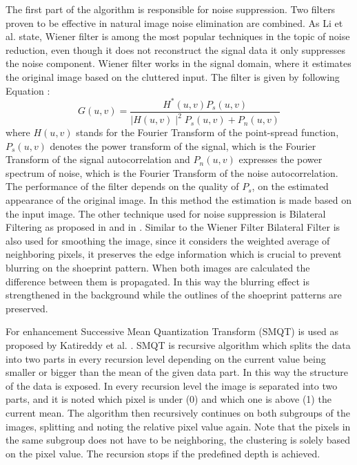 \documentclass[draft,final]{vutinfth} %
\begin{document}
\par
The first part of the algorithm is responsible for noise suppression.
Two filters proven to be effective in natural image noise elimination are combined.
As Li et al. \cite{li2014rapid} state, Wiener filter is among the most popular techniques in the topic of noise reduction, even though it does not reconstruct the signal data it only suppresses the noise component.
Wiener filter works in the signal domain, where it estimates the original image based on the cluttered input. 
The filter is given by following Equation \cite{Win}:
\[ G(u, v) = \frac{H^*(u,v) P_s(u, v)}{\mid H(u,v)\mid ^2 P_s (u, v) + P_n (u, v)}  \]
where $H(u,v)$ stands for the Fourier Transform of the point-spread function, $P_s (u,v)$ denotes the power transform of the signal, which is the Fourier Transform of the signal autocorrelation and $P_n(u,v)$ expresses the power spectrum of noise, which is the Fourier Transform of the noise autocorrelation.
The performance of the filter depends on the quality of $P_s$, on the estimated appearance of the original image.
In this method the estimation is made based on the input image.
The other technique used for noise suppression is Bilateral Filtering as proposed in \cite{huang2013self} and in \cite{zhang2016simultaneous}.
Similar to the Wiener Filter Bilateral Filter is also used for smoothing the image, since it considers the weighted average of neighboring pixels, it preserves the edge information which is crucial to prevent blurring on the shoeprint pattern. 
When both images are calculated the difference between them is propagated.
In this way the blurring effect is strengthened in the background while the outlines of the shoeprint patterns are preserved.
\par
For enhancement Successive Mean Quantization Transform (SMQT) \cite{nilsson2013smqt} is used as proposed by Katireddy et al. \cite{katireddy2017novel}.
SMQT is recursive algorithm which splits the data into two parts in every recursion level depending on the current value being smaller or bigger than the mean of the given data part.
In this way the structure of the data is exposed.
In every recursion level the image is separated into two parts, and it is noted which pixel is under (0) and which one is above (1) the current mean.
The algorithm then recursively continues on both subgroups of the images, splitting and noting the relative pixel value again.
Note that the pixels in the same subgroup does not have to be neighboring, the clustering is solely based on the pixel value.
The recursion stops if the predefined depth is achieved.
\end{document}
